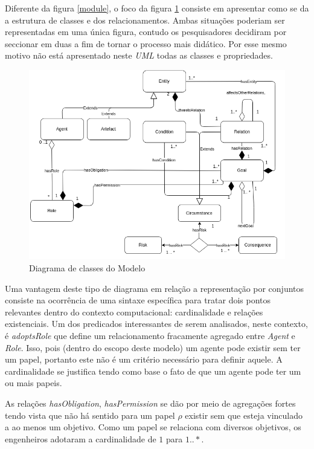 Diferente da figura \ref{module}, o foco da figura \ref{classdiagrama} consiste em apresentar como se da a estrutura de classes e dos relacionamentos. Ambas situações poderiam ser representadas em uma única figura, contudo os pesquisadores decidiram por seccionar em duas a fim de tornar o processo mais didático. Por esse mesmo motivo não está apresentado neste \textit{UML} todas as classes e propriedades.  

\begin{figure}[H]
  \centering
  \includegraphics[width=1\linewidth]{figure/Class.png} 
  \caption{Diagrama de classes do Modelo }
  \label{classdiagrama}
\end{figure}

Uma vantagem deste tipo de diagrama em relação a representação por conjuntos consiste na ocorrência de uma sintaxe específica para tratar dois pontos relevantes dentro do contexto computacional: cardinalidade e relações existenciais. Um dos predicados interessantes de serem analisados, neste contexto, é \textit{adoptsRole} que define um relacionamento fracamente agregado entre \textit{Agent} e \textit{Role}. Isso, pois (dentro do escopo deste modelo) um agente pode existir sem ter um papel, portanto este não é um critério necessário para definir aquele. A cardinalidade se justifica tendo como base o fato de que um agente pode ter um ou mais papeis. 

As relações \textit{hasObligation}, \textit{hasPermission} se dão por meio de agregações fortes tendo vista que não há sentido para um papel $\rho$ existir sem que esteja vinculado a ao menos um objetivo. Como um papel se relaciona com diversos objetivos, os engenheiros adotaram a cardinalidade de $1$ para $1 .. *$.


